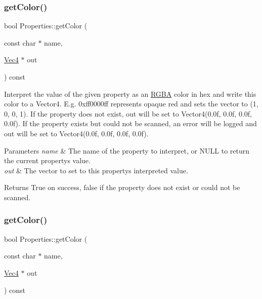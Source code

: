\subsubsection{\texorpdfstring{get\+Color()}{getColor()}\hspace{0.1cm}{\footnotesize\ttfamily [3/4]}}
{\footnotesize\ttfamily bool Properties\+::get\+Color (\begin{DoxyParamCaption}\item[{const char $\ast$}]{name,  }\item[{\hyperlink{classVec4}{Vec4} $\ast$}]{out }\end{DoxyParamCaption}) const}

Interpret the value of the given property as an \hyperlink{structRGBA}{R\+G\+BA} color in hex and write this color to a Vector4. E.\+g. 0xff0000ff represents opaque red and sets the vector to (1, 0, 0, 1). If the property does not exist, out will be set to Vector4(0.\+0f, 0.\+0f, 0.\+0f, 0.\+0f). If the property exists but could not be scanned, an error will be logged and out will be set to Vector4(0.\+0f, 0.\+0f, 0.\+0f, 0.\+0f).


\begin{DoxyParams}{Parameters}
{\em name} & The name of the property to interpret, or N\+U\+LL to return the current property\textquotesingle{}s value. \\
\hline
{\em out} & The vector to set to this property\textquotesingle{}s interpreted value.\\
\hline
\end{DoxyParams}
\begin{DoxyReturn}{Returns}
True on success, false if the property does not exist or could not be scanned. 
\end{DoxyReturn}
\mbox{\label{classProperties_a8fd1e181c6cb58cda989db6eca09ef4d}} 
\subsubsection{\texorpdfstring{get\+Color()}{getColor()}\hspace{0.1cm}{\footnotesize\ttfamily [4/4]}}
{\footnotesize\ttfamily bool Properties\+::get\+Color (\begin{DoxyParamCaption}\item[{const char $\ast$}]{name,  }\item[{\hyperlink{classVec4}{Vec4} $\ast$}]{out }\end{DoxyParamCaption}) const}

